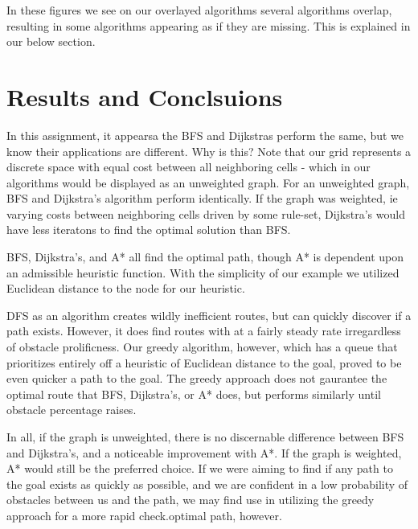 \documentclass{article}
\begin{document}
In these figures we see on our overlayed algorithms several algorithms overlap, resulting in some algorithms appearing as if they are missing. This is explained in our below section.

\section*{Results and Conclsuions}

In this assignment, it appearsa the BFS and Dijkstras perform the same, but we know their applications are different. Why is this? Note that our grid represents a discrete space with equal cost between all neighboring cells - which in our algorithms would be displayed as an unweighted graph. For an unweighted graph, BFS and Dijkstra's algorithm perform identically. If the graph was weighted, ie varying costs between neighboring cells driven by some rule-set, Dijkstra's would have less iteratons to find the optimal solution than BFS.

BFS, Dijkstra's, and A* all find the optimal path, though A* is dependent upon an admissible heuristic function. With the simplicity of our example we utilized Euclidean distance to the node for our heuristic.

DFS as an algorithm creates wildly inefficient routes, but can quickly discover if a path exists. However, it does find routes with at a fairly steady rate irregardless of obstacle prolificness. Our greedy algorithm, however, which has a queue that prioritizes entirely off a heuristic of Euclidean distance to the goal, proved to be even quicker a path to the goal. The greedy approach does not gaurantee the optimal route that BFS, Dijkstra's, or A* does, but performs similarly until obstacle percentage raises.

In all, if the graph is unweighted, there is no discernable difference between BFS and Dijkstra's, and a noticeable improvement with A*. If the graph is weighted, A* would still be the preferred choice. If we were aiming to find if any path to the goal exists as quickly as possible, and we are confident in a low probability of obstacles between us and the path, we may find use in utilizing the greedy approach for a more rapid check.optimal path, however.
\end{document}
